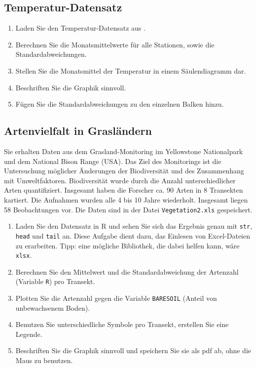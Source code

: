 \documentclass[]{book}
\providecommand{\tightlist}{%
  \setlength{\itemsep}{0pt}\setlength{\parskip}{0pt}}
\begin{document}
\hypertarget{temperatur-datensatz}{%
\subsection{Temperatur-Datensatz}\label{temperatur-datensatz}}

\begin{enumerate}
\def\labelenumi{\arabic{enumi}.}
\tightlist
\item
  Laden Sie den Temperatur-Datensatz aus \citet{Zuur2009a}.
\item
  Berechnen Sie die Monatsmittelwerte für alle Stationen, sowie die Standardabweichungen.
\item
  Stellen Sie die Monatsmittel der Temperatur in einem Säulendiagramm dar.
\item
  Beschriften Sie die Graphik sinnvoll.
\item
  Fügen Sie die Standardabweichungen zu den einzelnen Balken hinzu.
\end{enumerate}

\hypertarget{artenvielfalt-in-grasluxe4ndern}{%
\subsection{Artenvielfalt in Grasländern}\label{artenvielfalt-in-grasluxe4ndern}}

Sie erhalten Daten aus dem Grasland-Monitoring im Yellowstone Nationalpark und dem National Bison Range (USA). Das Ziel des Monitorings ist die Untersuchung möglicher Änderungen der Biodiversität und des Zusammenhang mit Umweltfaktoren. Biodiversität wurde durch die Anzahl unterschiedlicher Arten quantifiziert. Insgesamt haben die Forscher ca. 90 Arten in 8 Transekten kartiert. Die Aufnahmen wurden alle 4 bis 10 Jahre wiederholt. Insgesamt liegen 58 Beobachtungen vor. Die Daten sind in der Datei \texttt{Vegetation2.xls} gespeichert.

\begin{enumerate}
\def\labelenumi{\arabic{enumi}.}
\item
  Laden Sie den Datensatz in R und sehen Sie sich das Ergebnis genau mit \texttt{str}, \texttt{head} und \texttt{tail} an. Diese Aufgabe dient dazu, das Einlesen von Excel-Dateien zu erarbeiten. Tipp: eine mögliche Bibliothek, die dabei helfen kann, wäre \texttt{xlsx}.
\item
  Berechnen Sie den Mittelwert und die Standardabweichung der Artenzahl (Variable \texttt{R}) pro Transekt.
\item
  Plotten Sie die Artenzahl gegen die Variable \texttt{BARESOIL} (Anteil von unbewachsenem Boden).
\item
  Benutzen Sie unterschiedliche Symbole pro Transekt, erstellen Sie eine Legende.
\item
  Beschriften Sie die Graphik sinnvoll und speichern Sie sie als pdf ab, ohne die Maus zu benutzen.
\end{enumerate}
\end{document}
